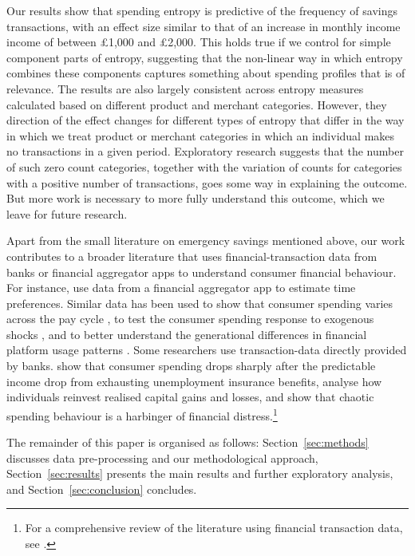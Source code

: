 Our results show that spending entropy is predictive of the frequency of
savings transactions, with an effect size similar to that of an increase in
monthly income income of between \pounds1,000 and \pounds2,000. This holds true
if we control for simple component parts of entropy, suggesting that the
non-linear way in which entropy combines these components captures something
about spending profiles that is of relevance. The results are also largely
consistent across entropy measures calculated based on different product and
merchant categories. However, they direction of the effect changes for
different types of entropy that differ in the way in which we treat product or
merchant categories in which an individual makes no transactions in a given
period. Exploratory research suggests that the number of such zero count
categories, together with the variation of counts for categories with a
positive number of transactions, goes some way in explaining the outcome. But
more work is necessary to more fully understand this outcome, which we leave
for future research.

Apart from the small literature on emergency savings mentioned above, our work
contributes to a broader literature that uses financial-transaction data
from banks or financial aggregator apps to understand consumer financial
behaviour. For instance, \citet{kuchler2020sticking} use data from a
financial aggregator app to estimate time preferences. Similar data has been
used to show that consumer spending varies across the pay cycle
\citep{gelman2014harnessing,olafsson2018liquid}, to test the consumer spending
response to exogenous shocks \citep{baker2018debt,baugh2014disentangling}, and
to better understand the generational differences in financial platform usage
patterns \citep{carlin2019generational}. Some researchers use transaction-data
directly provided by banks. \citet{ganong2019consumer} show that consumer
spending drops sharply after the predictable income drop from exhausting
unemployment insurance benefits, \citet{meyer2018fully} analyse how individuals
reinvest realised capital gains and losses, and \citet{muggleton2020evidence}
show that chaotic spending behaviour is a harbinger of financial
distress.\footnote{For a comprehensive review of the literature using financial
transaction data, see \citet{baker2022household}.}

The remainder of this paper is organised as follows: Section~\ref{sec:methods}
discusses data pre-processing and our methodological approach,
Section~\ref{sec:results} presents the main results and further exploratory
analysis, and Section~\ref{sec:conclusion} concludes.

